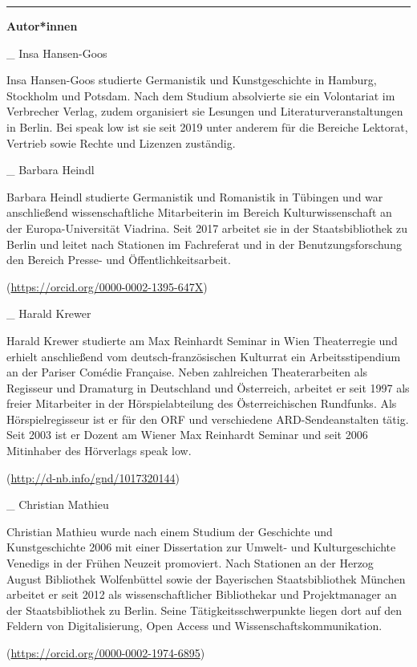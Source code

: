 \begin{center}\rule{0.5\linewidth}{0.5pt}\end{center}

\textbf{Autor*innen}

\_ Insa Hansen-Goos

Insa Hansen-Goos studierte Germanistik und Kunstgeschichte in Hamburg,
Stockholm und Potsdam. Nach dem Studium absolvierte sie ein Volontariat
im Verbrecher Verlag, zudem organisiert sie Lesungen und
Literaturveranstaltungen in Berlin. Bei speak low ist sie seit 2019
unter anderem für die Bereiche Lektorat, Vertrieb sowie Rechte und
Lizenzen zuständig.

\_ Barbara Heindl

Barbara Heindl studierte Germanistik und Romanistik in Tübingen und war
anschließend wissenschaftliche Mitarbeiterin im Bereich
Kulturwissenschaft an der Europa-Universität Viadrina. Seit 2017
arbeitet sie in der Staatsbibliothek zu Berlin und leitet nach Stationen
im Fachreferat und in der Benutzungsforschung den Bereich Presse- und
Öffentlichkeitsarbeit.

(\url{https://orcid.org/0000-0002-1395-647X})

\_ Harald Krewer

Harald Krewer studierte am Max Reinhardt Seminar in Wien Theaterregie
und erhielt anschließend vom deutsch-französischen Kulturrat ein
Arbeitsstipendium an der Pariser Comédie Française. Neben zahlreichen
Theaterarbeiten als Regisseur und Dramaturg in Deutschland und
Österreich, arbeitet er seit 1997 als freier Mitarbeiter in der
Hörspielabteilung des Österreichischen Rundfunks. Als Hörspielregisseur
ist er für den ORF und verschiedene ARD-Sendeanstalten tätig. Seit 2003
ist er Dozent am Wiener Max Reinhardt Seminar und seit 2006 Mitinhaber
des Hörverlags speak low.

(\url{http://d-nb.info/gnd/1017320144})

\_ Christian Mathieu

Christian Mathieu wurde nach einem Studium der Geschichte und
Kunstgeschichte 2006 mit einer Dissertation zur Umwelt- und
Kulturgeschichte Venedigs in der Frühen Neuzeit promoviert. Nach
Stationen an der Herzog August Bibliothek Wolfenbüttel sowie der
Bayerischen Staatsbibliothek München arbeitet er seit 2012 als
wissenschaftlicher Bibliothekar und Projektmanager an der
Staatsbibliothek zu Berlin. Seine Tätigkeitsschwerpunkte liegen dort auf
den Feldern von Digitalisierung, Open Access und
Wissenschaftskommunikation.

(\url{https://orcid.org/0000-0002-1974-6895})
